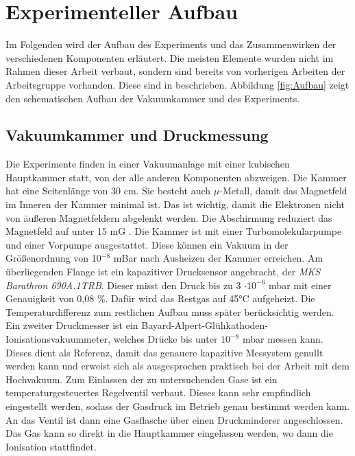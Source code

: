 \chapter{Experimenteller Aufbau}
\label{chap:Aufbau}
Im Folgenden wird der Aufbau des Experiments und das Zusammenwirken der verschiedenen Komponenten erläutert. Die meisten Elemente wurden nicht im Rahmen dieser Arbeit verbaut, sondern sind bereits von vorherigen Arbeiten der Arbeitsgruppe vorhanden. Diese sind in \cite{Holzte} beschrieben. Abbildung \ref{fig:Aufbau} zeigt den schematischen Aufbau der Vakuumkammer und des Experiments.

\section{Vakuumkammer und Druckmessung}
Die Experimente finden in einer Vakuumanlage mit einer kubischen Hauptkammer statt, von der alle anderen Komponenten abzweigen. Die Kammer hat eine Seitenlänge von 30 cm. Sie besteht auch $\mu$-Metall, damit das Magnetfeld im Inneren der Kammer minimal ist. Das ist wichtig, damit die Elektronen nicht von äußeren Magnetfeldern abgelenkt werden. Die Abschirmung reduziert das Magnetfeld auf unter 15 mG \cite{Holzte}. Die Kammer ist mit einer Turbomolekularpumpe und einer Vorpumpe ausgestattet. Diese können ein Vakuum in der Größenordnung von 10$^{-8}$ mBar nach Ausheizen der Kammer erreichen. Am überliegenden Flange ist ein kapazitiver Drucksensor angebracht, der \textit{MKS Barathron 690A.1TRB}. Dieser misst den Druck bis zu 3 $\cdot 10^{-6}$ mbar mit einer Genauigkeit von 0,08 \%. Dafür wird das Restgas auf \ang{45}C aufgeheizt. Die Temperaturdifferenz zum restlichen Aufbau muss später berücksichtig werden. Ein zweiter Druckmesser ist ein Bayard-Alpert-Glühkathoden-Ionisationsvakuummeter, welches Drücke bis unter $10^{-8}$ mbar messen kann. Dieses dient als Referenz, damit das genauere kapazitive Messystem genullt werden kann und erweist sich als ausgesprochen praktisch bei der Arbeit mit dem Hochvakuum.
Zum Einlassen der zu untersuchenden Gase ist ein temperaturgesteuertes Regelventil verbaut. Dieses kann sehr empfindlich eingestellt werden, sodass der Gasdruck im Betrieb genau bestimmt werden kann. An das Ventil ist dann eine Gasflasche über einen Druckminderer angeschlossen. Das Gas kann so direkt in die Hauptkammer eingelassen werden, wo dann die Ionisation stattfindet.

